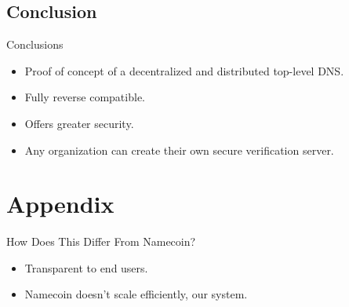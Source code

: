 \documentclass[11pt]{beamer}
\begin{document}
\subsection{Conclusion}
\begin{frame}{Conclusions}
	\begin{itemize}
		\item Proof of concept of a decentralized and distributed top-level DNS.
		\item Fully reverse compatible.
		\item Offers greater security.
		\item Any organization can create their own secure verification server.
		
	\end{itemize}
\end{frame}



\section*{Appendix}
\begin{frame}{How Does This Differ From Namecoin?}
	\begin{itemize}
		\item Transparent to end users.
		\item Namecoin doesn't scale efficiently, our system.
	\end{itemize}
\end{frame}
\end{document}
